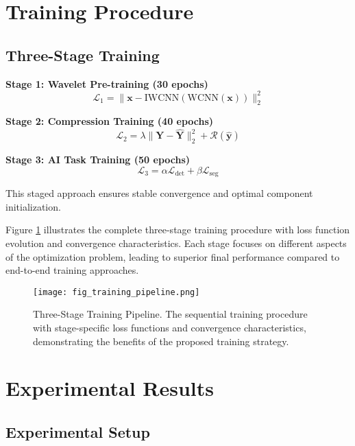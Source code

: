 \documentclass[conference]{IEEEtran}
\begin{document}
\section{Training Procedure}

\subsection{Three-Stage Training}

\textbf{Stage 1: Wavelet Pre-training (30 epochs)}
\begin{equation}
\mathcal{L}_1 = \|\mathbf{x} - \text{IWCNN}(\text{WCNN}(\mathbf{x}))\|_2^2
\end{equation}

\textbf{Stage 2: Compression Training (40 epochs)}
\begin{equation}
\mathcal{L}_2 = \lambda \|\mathbf{Y} - \hat{\mathbf{Y}}\|_2^2 + \mathcal{R}(\hat{\mathbf{y}})
\end{equation}

\textbf{Stage 3: AI Task Training (50 epochs)}
\begin{equation}
\mathcal{L}_3 = \alpha \mathcal{L}_{\text{det}} + \beta \mathcal{L}_{\text{seg}}
\end{equation}

This staged approach ensures stable convergence and optimal component initialization.

Figure \ref{fig:training_pipeline} illustrates the complete three-stage training procedure with loss function evolution and convergence characteristics. Each stage focuses on different aspects of the optimization problem, leading to superior final performance compared to end-to-end training approaches.

\begin{figure}[htbp]
\centering
\texttt{[image: fig\_training\_pipeline.png]}
\caption{Three-Stage Training Pipeline. The sequential training procedure with stage-specific loss functions and convergence characteristics, demonstrating the benefits of the proposed training strategy.}
\label{fig:training_pipeline}
\end{figure}

\section{Experimental Results}

\subsection{Experimental Setup}
\end{document}
